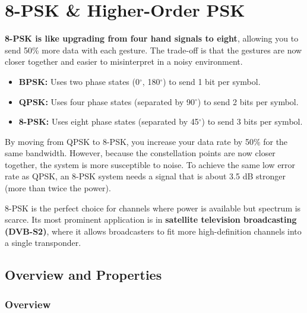 
\chapter{8-PSK \& Higher-Order PSK}
\label{ch:8psk}

\begin{nontechnical}
    \textbf{8-PSK is like upgrading from four hand signals to eight}, allowing you to send 50\% more data with each gesture. The trade-off is that the gestures are now closer together and easier to misinterpret in a noisy environment.

    \begin{itemize}
        \item \textbf{BPSK:} Uses two phase states (0$^\circ$, 180$^\circ$) to send 1 bit per symbol.
        \item \textbf{QPSK:} Uses four phase states (separated by 90$^\circ$) to send 2 bits per symbol.
        \item \textbf{8-PSK:} Uses eight phase states (separated by 45$^\circ$) to send 3 bits per symbol.
    \end{itemize}

     By moving from QPSK to 8-PSK, you increase your data rate by 50\% for the same bandwidth. However, because the constellation points are now closer together, the system is more susceptible to noise. To achieve the same low error rate as QPSK, an 8-PSK system needs a signal that is about 3.5 dB stronger (more than twice the power).

     8-PSK is the perfect choice for  channels where power is available but spectrum is scarce. Its most prominent application is in \textbf{satellite television broadcasting (DVB-S2)}, where it allows broadcasters to fit more high-definition channels into a single transponder.
\end{nontechnical}


\section{Overview and Properties}

\subsection{Overview}

